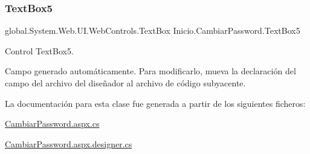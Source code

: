 \subsubsection{\texorpdfstring{TextBox5}{TextBox5}}
{\footnotesize\ttfamily global.\+System.\+Web.\+U\+I.\+Web\+Controls.\+Text\+Box Inicio.\+Cambiar\+Password.\+Text\+Box5\hspace{0.3cm}{\ttfamily [protected]}}



Control Text\+Box5. 

Campo generado automáticamente. Para modificarlo, mueva la declaración del campo del archivo del diseñador al archivo de código subyacente. 

La documentación para esta clase fue generada a partir de los siguientes ficheros\+:\begin{DoxyCompactItemize}
\item 
\mbox{\hyperlink{CambiarPassword_8aspx_8cs}{Cambiar\+Password.\+aspx.\+cs}}\item 
\mbox{\hyperlink{CambiarPassword_8aspx_8designer_8cs}{Cambiar\+Password.\+aspx.\+designer.\+cs}}\end{DoxyCompactItemize}
